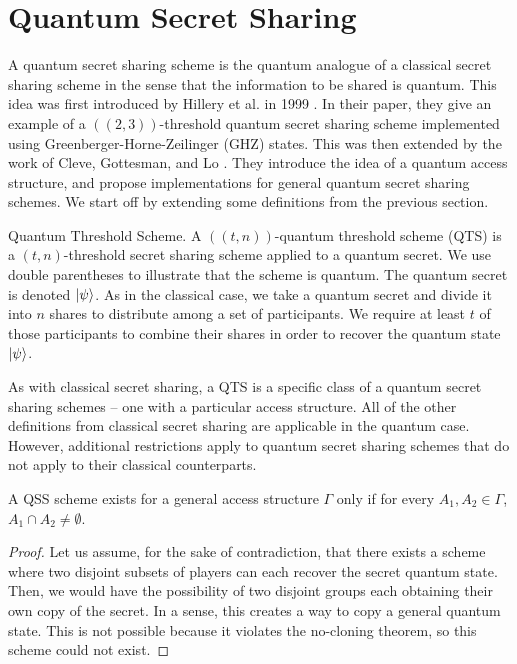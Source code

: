 \section{Quantum Secret Sharing}
\label{section:qss}

A quantum secret sharing scheme is the quantum analogue of a classical secret sharing scheme in the sense that the information to be shared is quantum. This idea was first introduced by Hillery et al. in 1999 \cite{hillery_quantum_1999}. In their paper, they give an example of a $((2,3))$-threshold quantum secret sharing scheme implemented using Greenberger-Horne-Zeilinger (GHZ) states. This was then extended by the work of Cleve, Gottesman, and Lo \cite{cleve_how_1999}. They introduce the idea of a quantum access structure, and propose implementations for general quantum secret sharing schemes. We start off by extending some definitions from the previous section.

\begin{definition}{Quantum Threshold Scheme.}
    \label{defn:qts}
    A $((t,n))$-quantum threshold scheme (QTS) is a $(t,n)$-threshold secret sharing scheme applied to a quantum secret. We use double parentheses to illustrate that the scheme is quantum. The quantum secret is denoted $\ket{\psi}$. As in the classical case, we take a quantum secret and divide it into $n$ shares to distribute among a set of participants. We require at least $t$ of those participants to combine their shares in order to recover the quantum state $\ket{\psi}$.
\end{definition}

As with classical secret sharing, a QTS is a specific class of a quantum secret sharing schemes -- one with a particular access structure. All of the other definitions from classical secret sharing are applicable in the quantum case. However,  additional restrictions apply to quantum secret sharing schemes that do not apply to their classical counterparts.

\begin{theorem}
    \label{thm:qss-disjoint}
    A QSS scheme exists for a general access structure $\Gamma$ only if for every $A_1, A_2 \in \Gamma$, $A_1 \cap A_2 \neq \emptyset$.
\end{theorem}

\begin{proof}
    Let us assume, for the sake of contradiction, that there exists a scheme where two disjoint subsets of players can each recover the secret quantum state. Then, we would have the possibility of two disjoint groups each obtaining their own copy of the secret. In a sense, this creates a way to copy a general quantum state. This is not possible because it violates the no-cloning theorem, so this scheme could not exist.
\end{proof}

